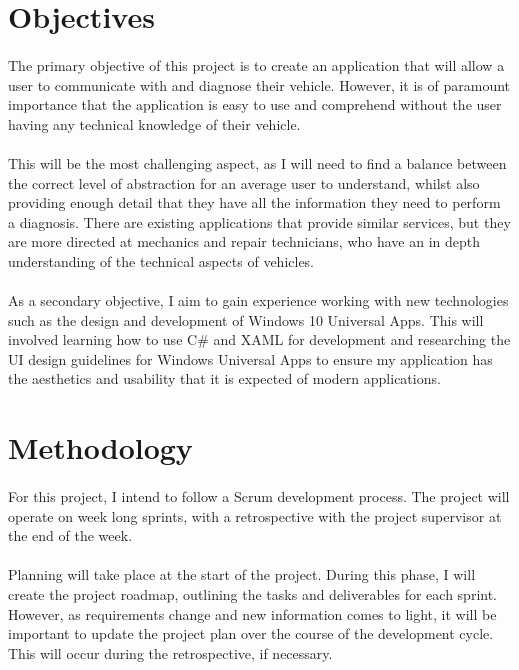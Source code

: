\documentclass[12pt]{report}
\begin{document}
		\section{Objectives}
			\paragraph{}{
			The primary objective of this project is to create an application that will allow a user to communicate with and diagnose their vehicle. However, it is of paramount importance that the application is easy to use and comprehend without the user having any technical knowledge of their vehicle.  
			}
			\paragraph{}
			{
			This will be the most challenging aspect, as I will need to find a balance between the correct level of abstraction for an average user to understand, whilst also providing enough detail that they have all the information they need to perform a diagnosis. There are existing applications that provide similar services, but they are more directed at mechanics and repair technicians, who have an in depth understanding of the technical aspects of vehicles.
			}
			\paragraph{}{
			As a secondary objective, I aim to gain experience working with new technologies such as the design and development of Windows 10 Universal Apps. This will involved learning how to use C{\#} and XAML for development and researching the UI design guidelines for Windows Universal Apps to ensure my application has the aesthetics and usability that it is expected of modern applications.
			}
		\section{Methodology}
			\paragraph{}{
			For this project, I intend to follow a Scrum development process. The project will operate on week long sprints, with a retrospective with the project supervisor at the end of the week.
			}
			\paragraph{}{
			Planning will take place at the start of the project. During this phase, I will create the project roadmap, outlining the tasks and deliverables for each sprint. However, as requirements change and new information comes to light, it will be important to update the project plan over the course of the development cycle. This will occur during the retrospective, if necessary.
			}
\end{document}
